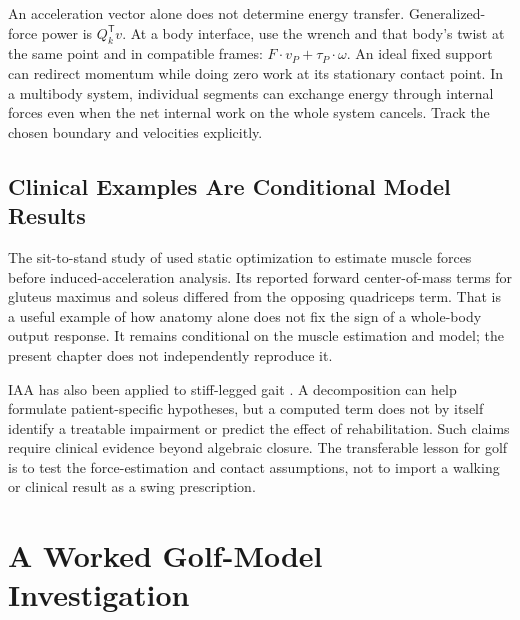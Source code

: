 An acceleration vector alone does not determine energy transfer. Generalized-force power is \(Q_k^{\mathsf T}v\). At a body interface, use the wrench and that body's twist at the same point and in compatible frames: \(F\cdot v_P+\tau_P\cdot\omega\). An ideal fixed support can redirect momentum while doing zero work at its stationary contact point. In a multibody system, individual segments can exchange energy through internal forces even when the net internal work on the whole system cancels. Track the chosen boundary and velocities explicitly.

\subsection{Clinical Examples Are Conditional Model Results}
The sit-to-stand study of \citep{Caruthers2016} used static optimization to estimate muscle forces before induced-acceleration analysis. Its reported forward center-of-mass terms for gluteus maximus and soleus differed from the opposing quadriceps term. That is a useful example of how anatomy alone does not fix the sign of a whole-body output response. It remains conditional on the muscle estimation and model; the present chapter does not independently reproduce it.

IAA has also been applied to stiff-legged gait \citep{RileyKerrigan1999}. A decomposition can help formulate patient-specific hypotheses, but a computed term does not by itself identify a treatable impairment or predict the effect of rehabilitation. Such claims require clinical evidence beyond algebraic closure. The transferable lesson for golf is to test the force-estimation and contact assumptions, not to import a walking or clinical result as a swing prescription.

\section{A Worked Golf-Model Investigation}
\label{sec:golf_implications}


